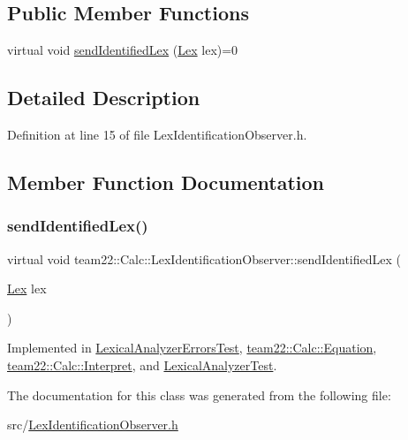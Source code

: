 \subsection*{Public Member Functions}
\begin{DoxyCompactItemize}
\item 
virtual void \hyperlink{classteam22_1_1_calc_1_1_lex_identification_observer_ac139f75c560625ec6fdb2e34cf0d4884}{send\+Identified\+Lex} (\hyperlink{classteam22_1_1_calc_1_1_lex}{Lex} lex)=0
\end{DoxyCompactItemize}


\subsection{Detailed Description}


Definition at line 15 of file Lex\+Identification\+Observer.\+h.



\subsection{Member Function Documentation}
\mbox{\label{classteam22_1_1_calc_1_1_lex_identification_observer_ac139f75c560625ec6fdb2e34cf0d4884}} 
\subsubsection{\texorpdfstring{send\+Identified\+Lex()}{sendIdentifiedLex()}}
{\footnotesize\ttfamily virtual void team22\+::\+Calc\+::\+Lex\+Identification\+Observer\+::send\+Identified\+Lex (\begin{DoxyParamCaption}\item[{\hyperlink{classteam22_1_1_calc_1_1_lex}{Lex}}]{lex }\end{DoxyParamCaption})\hspace{0.3cm}{\ttfamily [pure virtual]}}



Implemented in \hyperlink{struct_lexical_analyzer_errors_test_ac943a4238a0eb77957e2027740603c44}{Lexical\+Analyzer\+Errors\+Test}, \hyperlink{classteam22_1_1_calc_1_1_equation_ad5768951865500ec7fc514f676de2851}{team22\+::\+Calc\+::\+Equation}, \hyperlink{classteam22_1_1_calc_1_1_interpret_a479c65c010f4ef1060049b684e5f7eb6}{team22\+::\+Calc\+::\+Interpret}, and \hyperlink{struct_lexical_analyzer_test_a1c412feae956dcdc6ca0519e361e8f64}{Lexical\+Analyzer\+Test}.



The documentation for this class was generated from the following file\+:\begin{DoxyCompactItemize}
\item 
src/\hyperlink{_lex_identification_observer_8h}{Lex\+Identification\+Observer.\+h}\end{DoxyCompactItemize}
